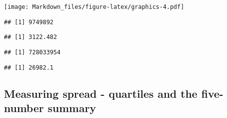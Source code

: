 \documentclass[
]{article}
\newenvironment{Shaded}{\begin{snugshade}}{\end{snugshade}}
\newcommand{\CommentTok}[1]{\textcolor[rgb]{0.56,0.35,0.01}{\textit{#1}}}
\newcommand{\FunctionTok}[1]{\textcolor[rgb]{0.00,0.00,0.00}{#1}}
\newcommand{\NormalTok}[1]{#1}
\newcommand{\SpecialCharTok}[1]{\textcolor[rgb]{0.00,0.00,0.00}{#1}}
\begin{document}
\texttt{[image: Markdown\_files/figure-latex/graphics-4.pdf]}

\begin{Shaded}
\end{Shaded}

\begin{verbatim}
## [1] 9749892
\end{verbatim}

\begin{Shaded}
\end{Shaded}

\begin{verbatim}
## [1] 3122.482
\end{verbatim}

\begin{Shaded}
\end{Shaded}

\begin{verbatim}
## [1] 728033954
\end{verbatim}

\begin{Shaded}
\end{Shaded}

\begin{verbatim}
## [1] 26982.1
\end{verbatim}

\hypertarget{measuring-spread---quartiles-and-the-five-number-summary}{%
\subsection{Measuring spread - quartiles and the five-number
summary}\label{measuring-spread---quartiles-and-the-five-number-summary}}
\end{document}
